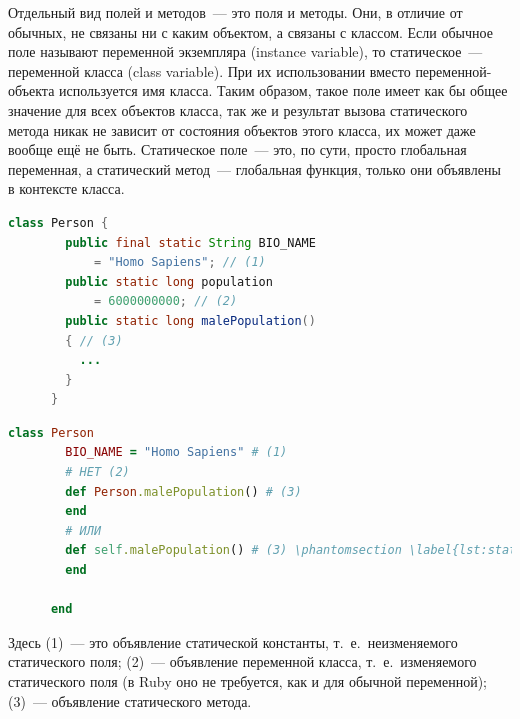 \documentclass[a4paper, 14pt, titlepage]{extarticle}
\newcommand{\eng}[1]{{\English #1}}
\newcommand{\define}[1]{\uwave{#1}}
\newcommand{\ie}{т.~е.~}
\newenvironment{halfpage}%
    {\noindent\begin{minipage}[h]{0.49\linewidth}} %
    {\end{minipage}\hfill}
\begin{document}
  Отдельный вид полей и методов~--- это \define{статические} поля и методы. Они, в отличие от
  обычных, не связаны ни с каким объектом, а связаны с классом. Если обычное поле называют
  переменной экземпляра (\eng{instance variable}), то статическое~--- переменной класса (\eng{class
  variable}). При их использовании вместо переменной-объекта используется имя класса. Таким образом,
  такое поле имеет как бы общее значение для всех объектов класса, так же и результат вызова
  статического метода никак не зависит от состояния объектов этого класса, их может даже вообще ещё
  не быть. Статическое поле~--- это, по сути, просто глобальная переменная, а статический метод~---
  глобальная функция, только они объявлены в контексте класса.

  \begin{halfpage}
    \begin{lstlisting}[language=Java, title={Объявление static'ов в Java}, gobble=6, texcl]
      class Person {
        public final static String BIO_NAME
            = "Homo Sapiens"; // (1)
        public static long population
            = 6000000000; // (2)
        public static long malePopulation()
        { // (3)
          ...
        }
      }
    \end{lstlisting}
  \end{halfpage}
  \begin{halfpage}
    \begin{lstlisting}[language=Ruby, title={Объявление static'ов в Ruby}, gobble=6, texcl]
      class Person
        BIO_NAME = "Homo Sapiens" # (1)
        # НЕТ (2)
        def Person.malePopulation() # (3)
        end
        # ИЛИ
        def self.malePopulation() # (3) \phantomsection \label{lst:static_self}
        end

      end
    \end{lstlisting}
  \end{halfpage}

  Здесь (1)~--- это объявление статической константы, \ie неизменяемого статического поля; (2)~---
  объявление переменной класса, \ie изменяемого статического поля (в Ruby оно не требуется, как и
  для обычной переменной); (3)~--- объявление статического метода.
\end{document}

